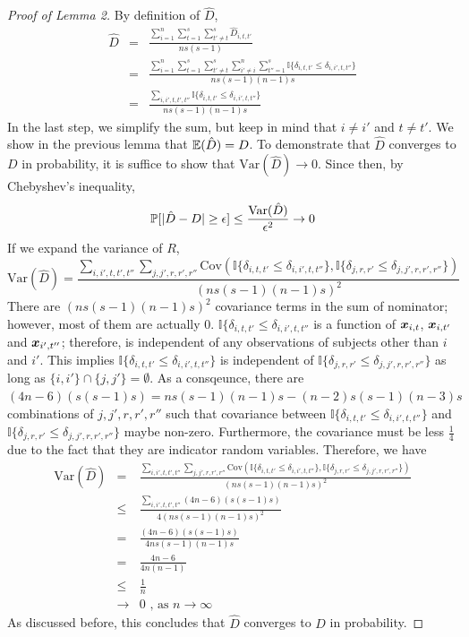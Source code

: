 \documentclass{article}
\begin{document}
\begin{proof}[Proof of Lemma 2]
	By definition of $\hat{D}$,
	\begin{eqnarray*}  
		\hat{D} &=&\frac{\sum\limits_{i=1}^{n} \sum\limits_{t=1}^{s}  \sum\limits_{t'\neq t}^{s} \hat{D}_{i,t,t'}}{ns(s-1)}\\
		&=& \frac{\sum\limits_{i=1}^{n} \sum\limits_{t=1}^{s}  \sum\limits_{t'\neq t}^{s}\sum\limits_{i' \neq i}^{n} \sum\limits_{t''=1}^{s} \mathbb{I}\{\delta_{i,t,t'} \leq \delta_{i,i',t,t''} \} }{ns(s-1)(n-1)s}\\
		&=& \frac{\sum\limits_{i,i',t,t',t''} \mathbb{I}\{\delta_{i,t,t'} \leq \delta_{i,i',t,t''} \}  }{ns(s-1)(n-1)s}
	\end{eqnarray*}
	In the last step, we simplify the sum, but keep in mind that $i\neq i'$ and $t \neq t'$. We show in the previous lemma that $\mathbb{E}(\hat{D})=D$. To demonstrate that $\hat{D}$ converges to $D$ in probability, it is suffice to show that $\text{Var}(\hat{D}) \rightarrow 0$. Since then, by Chebyshev's inequality,
	\[\mathbb{P}[|\hat{D}-D| \geq \epsilon] \leq \frac{\text{Var}(\hat{D})}{\epsilon^2} \rightarrow 0\]
	If we expand the variance of $R$, 
	\[\text{Var}(\hat{D})= \frac{\sum\limits_{i,i',t,t',t''} \sum\limits_{j,j',r,r',r''} \text{Cov}(\mathbb{I}\{\delta_{i,t,t'} \leq \delta_{i,i',t,t''} \},\mathbb{I}\{\delta_{j,r,r'} \leq \delta_{j,j',r,r',r''} \})}{(ns(s-1)(n-1)s)^2} \]
	There are $(ns(s-1)(n-1)s)^2$ covariance terms in the sum of nominator; however, most of them are actually $0$. $\mathbb{I}\{\delta_{i,t,t'} \leq \delta_{i,i',t,t''}$ is a function of $\boldsymbol{x}_{i,t}$, $\boldsymbol{x}_{i,t'}$ and $\boldsymbol{x}_{i',t''}$; therefore, is independent of any observations of subjects other than $i$ and $i'$. This implies $\mathbb{I}\{\delta_{i,t,t'} \leq \delta_{i,i',t,t''} \}$ is independent of $\mathbb{I}\{\delta_{j,r,r'} \leq \delta_{j,j',r,r',r''} \}$ as long as $\{i,i'\} \cap \{j,j'\} = \emptyset$. As a consqeunce, there are $(4n-6)(s(s-1)s)=ns(s-1)(n-1)s-(n-2)s(s-1)(n-3)s$ combinations of $j,j',r,r',r''$ such that covariance between $\mathbb{I}\{\delta_{i,t,t'} \leq \delta_{i,i',t,t''} \}$ and $\mathbb{I}\{\delta_{j,r,r'} \leq \delta_{j,j',r,r',r''} \}$ maybe non-zero. Furthermore, the covariance must be less $\frac{1}{4}$ due to the fact that they are indicator random variables. Therefore, we have 
	\begin{eqnarray*} 
		\text{Var}(\hat{D})&=& \frac{\sum\limits_{i,i',t,t',t''} \sum\limits_{j,j',r,r',r''} \text{Cov}(\mathbb{I}\{\delta_{i,t,t'} \leq \delta_{i,i',t,t''} \},\mathbb{I}\{\delta_{j,r,r'} \leq \delta_{j,j',r,r',r''} \})}{(ns(s-1)(n-1)s)^2} \\
		&\leq& \frac{\sum\limits_{i,i',t,t',t''}  (4n-6)(s(s-1)s)}{4(ns(s-1)(n-1)s)^2} \\
		&=& \frac{ (4n-6)(s(s-1)s)}{4ns(s-1)(n-1)s} \\
		&=& \frac{4n-6}{4n(n-1)} \\
		&\leq& \frac{1}{n}  \\
		&\rightarrow& 0 \text{ , as $n\rightarrow \infty$} 
	\end{eqnarray*}
	As discussed before, this concludes that $\hat{D}$ converges to $D$ in probability. 
\end{proof}






\newpage
\small{


}
\end{document}
